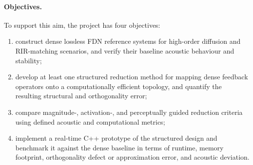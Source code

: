 \documentclass[12pt,a4paper]{article}
\begin{document}
\paragraph{Objectives.}
To support this aim, the project has four objectives:
\begin{enumerate}
    \item construct dense lossless FDN reference systems for high-order diffusion and RIR-matching scenarios, and verify their baseline acoustic behaviour and stability;
    \item develop at least one structured reduction method for mapping dense feedback operators onto a computationally efficient topology, and quantify the resulting structural and orthogonality error;
    \item compare magnitude-, activation-, and perceptually guided reduction criteria using defined acoustic and computational metrics;
    \item implement a real-time C++ prototype of the structured design and benchmark it against the dense baseline in terms of runtime, memory footprint, orthogonality defect or approximation error, and acoustic deviation.
\end{enumerate}
\end{document}
